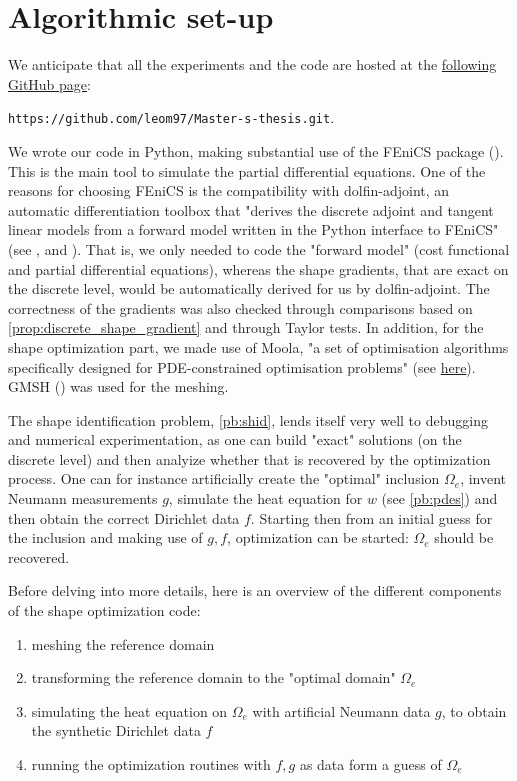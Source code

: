 \documentclass[english,a4paper,9pt,oneside]{scrbook}	%
\theoremstyle{break}
\theoremstyle{remark}
\begin{document}
\section{Algorithmic set-up}
\label{sec:implementation}

We anticipate that all the experiments and the code are hosted at the \href{https://github.com/leom97/Master-s-thesis.git}{following GitHub page}: 
\begin{center}
\texttt{https://github.com/leom97/Master-s-thesis.git}.
\end{center}
We wrote our code in Python, making substantial use of the FEniCS package (\cite{fenics}). This is the main tool to simulate the partial differential equations. One of the reasons for choosing FEniCS is the compatibility with dolfin-adjoint, an automatic differentiation toolbox that "derives the discrete adjoint and tangent linear models from a forward model written in the Python interface to FEniCS" (see \cite{dolfin-adjoint_1}, \cite{dolfin-adjoint_2} and \cite{dolfin-adjoint_3}). That is, we only needed to code the "forward model" (cost functional and partial differential equations), whereas the shape gradients, that are exact on the discrete level, would be automatically derived for us by dolfin-adjoint. The correctness of the gradients was also checked through comparisons based on \cref{prop:discrete_shape_gradient} and through Taylor tests. In addition, for the shape optimization part, we made use of Moola, "a set of optimisation algorithms specifically designed for PDE-constrained optimisation problems" (see \href{https://github.com/funsim/moola}{here}). GMSH (\cite{gmsh}) was used for the meshing.

The shape identification problem, \cref{pb:shid}, lends itself very well to debugging and numerical experimentation, as one can build "exact" solutions (on the discrete level) and then analyize whether that is recovered by the optimization process. One can for instance artificially create the "optimal" inclusion $\Omega_e$, invent Neumann measurements $g$, simulate the heat equation for $w$ (see \cref{pb:pdes}) and then obtain the correct Dirichlet data $f$. Starting then from an initial guess for the inclusion and making use of $g,f$, optimization can be started: $\Omega_e$ should be recovered.

Before delving into more details, here is an overview of the different components of the shape optimization code:
\begin{enumerate}
	\item meshing the reference domain
	\item transforming the reference domain to the "optimal domain" $\Omega_e$
	\item simulating the heat equation on $\Omega_e$ with artificial Neumann data $g$, to obtain the synthetic Dirichlet data $f$
	\item running the optimization routines with $f,g$ as data form a guess of $\Omega_e$
\end{enumerate}
\end{document}
